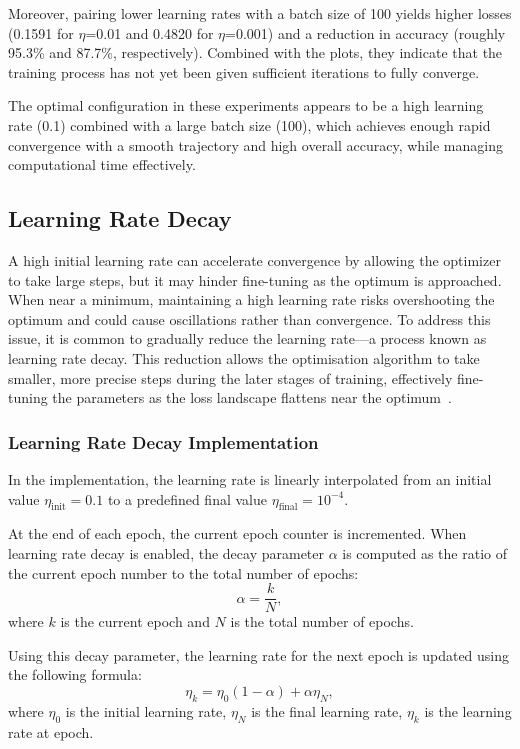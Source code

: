 Moreover, pairing lower learning rates with a batch size of 100 yields higher losses (0.1591 for \(\eta\)=0.01 and 0.4820 for \(\eta\)=0.001) and a reduction in accuracy (roughly 95.3\% and 87.7\%, respectively). Combined with the plots, they indicate that the training process has not yet been given sufficient iterations to fully converge.

The optimal configuration in these experiments appears to be a high learning rate (0.1) combined with a large batch size (100), which achieves enough rapid convergence with a smooth trajectory and high overall accuracy, while managing computational time effectively.



\subsection{Learning Rate Decay}

A high initial learning rate can accelerate convergence by allowing the optimizer to take large steps, but it may hinder fine-tuning as the optimum is approached. When near a minimum, maintaining a high learning rate risks overshooting the optimum and could cause oscillations rather than convergence. To address this issue, it is common to gradually reduce the learning rate—a process known as learning rate decay. This reduction allows the optimisation algorithm to take smaller, more precise steps during the later stages of training, effectively fine-tuning the parameters as the loss landscape flattens near the optimum~\cite{you2019how}.

\subsubsection{Learning Rate Decay Implementation}
In the implementation, the learning rate is linearly interpolated from an initial value \(\eta_{\mathrm{init}} = 0.1\) to a predefined final value \(\eta_{\mathrm{final}} = 10^{-4}\).

At the end of each epoch, the current epoch counter is incremented. When learning rate decay is enabled, the decay parameter \(\alpha\) is computed as the ratio of the current epoch number to the total number of epochs:
\[
    \alpha = \frac{k}{N},
\]
where \(k\) is the current epoch and \(N\) is the total number of epochs.

Using this decay parameter, the learning rate for the next epoch is updated using the following formula:
\[
    \eta_k = \eta_0 (1 - \alpha) + \alpha \eta_N,
\]
where \(\eta_0\) is the initial learning rate, \(\eta_N\) is the final learning rate, \(\eta_k\) is the learning rate at epoch.


